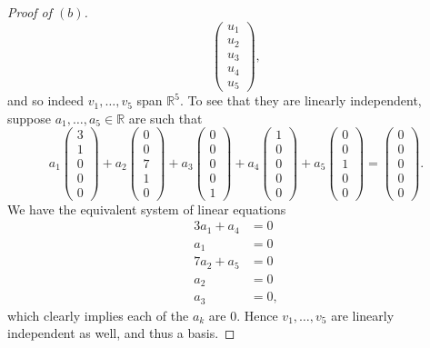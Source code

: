 \documentclass{extarticle}
\newcommand{\R}{\mathbb{R}}
\begin{document}
\begin{proof}[Proof of $(b)$]
\begin{equation*}
\begin{pmatrix} u_1 \\ u_2 \\ u_3 \\ u_4\\ u_5 \end{pmatrix},
\end{equation*}
and so indeed $v_1,\dots, v_5$ span $\R^5$.  To see that they are linearly independent, suppose $a_1,\dots,a_5\in\R$ are such that 
\begin{equation*}
a_1\begin{pmatrix}3\\1\\0\\0\\0\end{pmatrix} + a_2\begin{pmatrix}0\\0\\7\\1\\0\end{pmatrix} + a_3\begin{pmatrix}0\\0\\0\\0\\1\end{pmatrix} + a_4\begin{pmatrix}1\\0\\0\\0\\0\end{pmatrix} + a_5\begin{pmatrix}0\\0\\1\\0\\0\end{pmatrix} = \begin{pmatrix}0\\0\\0\\0\\0\end{pmatrix}.
\end{equation*}
We have the equivalent system of linear equations
\begin{align*}
3a_1 + a_4 &= 0\\
a_1 &= 0\\
7a_2 + a_5 &= 0\\
a_2 &= 0\\
a_3 &= 0,
\end{align*}
which clearly implies each of the $a_k$ are $0$.  Hence $v_1,\dots,v_5$ are linearly independent as well, and thus a basis.
\end{proof}
\end{document}
